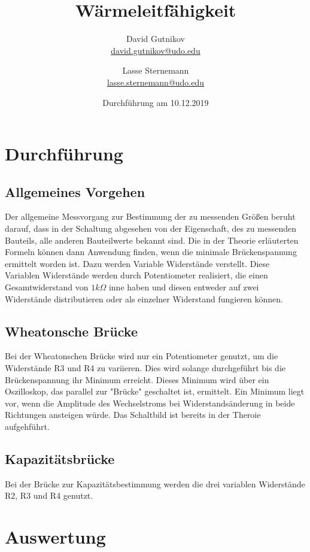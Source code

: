 \documentclass[titlepage = firstcover]{scrartcl}
\title{Wärmeleitfähigkeit}
\author{
  David Gutnikov\\
  \href{mailto:david.gutnikov@udo.edu}{david.gutnikov@udo.edu}
 \and 
  Lasse Sternemann\\
  \href{mailto:lasse.sternemann@udo.edu}{lasse.sternemann@udo.edu}
}
\date{Durchführung am 10.12.2019}
\begin{document}
  \maketitle
  \newpage
  \tableofcontents
  \newpage

  \section{Durchführung}

  \subsection{Allgemeines Vorgehen}
  Der allgemeine Messvorgang zur Bestimmung der zu messenden Größen beruht darauf, dass in der Schaltung abgesehen von der Eigenschaft, des zu messenden 
  Bauteils, alle anderen Bauteilwerte bekannt sind. Die in der Theorie erläuterten Formeln können dann Anwendung finden, wenn die minimale Brückenspannung
  ermittelt worden ist. Dazu werden Variable Widerstände verstellt. Diese Variablen Widerstände werden durch Potentiometer realisiert, die einen 
  Gesamtwiderstand von $1k\Omega$ inne haben und diesen entweder auf zwei Widerstände distributieren oder als einzelner Widerstand fungieren können.

  \subsection{Wheatonsche Brücke}
  Bei der Wheatonschen Brücke wird nur ein Potentiometer genutzt, um die Widerstände R3 und R4 zu variieren. Dies wird solange durchgeführt bis die 
  Brückenspannung ihr Minimum erreicht. Dieses Minimum wird über ein Oszilloskop, das parallel zur "Brücke" geschaltet ist, ermittelt. Ein Minimum liegt 
  vor, wenn die Amplitude des Wechselstroms bei Widerstandsänderung in beide Richtungen ansteigen würde. Das Schaltbild ist bereits in der Theroie 
  aufgehführt.

  \subsection{Kapazitätsbrücke}
  Bei der Brücke zur Kapazitätsbestimmung werden die drei variablen Widerstände R2, R3 und R4 genutzt.




  \newpage


  \section{Auswertung}
\end{document}
